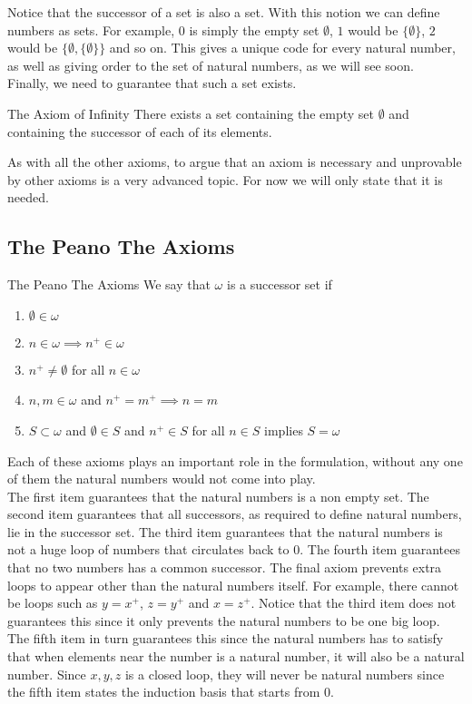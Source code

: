 \documentclass[a4paper]{article}
\begin{document}
Notice that the successor of a set is also a set. With this notion we can define numbers as sets. For example, $0$ is simply the empty set $\emptyset$, $1$ would be $\{\emptyset\}$, $2$ would be $\{\emptyset,\{\emptyset\}\}$ and so on. This gives a unique code for every natural number, as well as giving order to the set of natural numbers, as we will see soon. \\

Finally, we need to guarantee that such a set exists. 

\begin{axm}{The Axiom of Infinity}{} There exists a set containing the empty set $\emptyset$ and containing the successor of each of its elements. 
\end{axm}

As with all the other axioms, to argue that an axiom is necessary and unprovable by other axioms is a very advanced topic. For now we will only state that it is needed. 

\subsection{The Peano The Axioms}
\begin{defn}{The Peano The Axioms}{} We say that $\omega$ is a successor set if
\begin{enumerate}
\item $\emptyset\in\omega$
\item $n\in\omega\implies n^+\in\omega$
\item $n^+\neq\emptyset$ for all $n\in\omega$
\item $n,m\in\omega$ and $n^+=m^+\implies n=m$
\item $S\subset\omega$ and $\emptyset\in S$ and $n^+\in S$ for all $n\in S$ implies $S=\omega$
\end{enumerate}
\end{defn}

Each of these axioms plays an important role in the formulation, without any one of them the natural numbers would not come into play. \\

The first item guarantees that the natural numbers is a non empty set. The second item guarantees that all successors, as required to define natural numbers, lie in the successor set. The third item guarantees that the natural numbers is not a huge loop of numbers that circulates back to $0$. The fourth item guarantees that no two numbers has a common successor. The final axiom prevents extra loops to appear other than the natural numbers itself. For example, there cannot be loops such as $y=x^+$, $z=y^+$ and $x=z^+$. Notice that the third item does not guarantees this since it only prevents the natural numbers to be one big loop. The fifth item in turn guarantees this since the natural numbers has to satisfy that when elements near the number is a natural number, it will also be a natural number. Since $x,y,z$ is a closed loop, they will never be natural numbers since the fifth item states the induction basis that starts from $0$. \\
\end{document}
